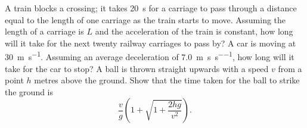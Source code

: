 \documentclass[a4paper]{exam}
\begin{document}
\begin{questions}
    \question A train blocks a crossing; it takes \SI{20}{\second} for a carriage to pass through a distance
              equal to the length of one carriage as the train starts to move. Assuming the length of a carriage is $ L $
              and the acceleration of the train is constant, how long will it take for the next twenty railway carriages
              to pass by?
    \question A car is moving at \SI{30}{\metre\per\second}. Assuming an average deceleration of \SI{7.0}{\metre\per\second\per\second},
              how long will it take for the car to stop?
    \question A ball is thrown straight upwards with a speed $ v $ from a point $ h $ metres above the ground. Show that the time
              taken for the ball to strike the ground is
              \[ \frac{v}{g}\left( 1 + \sqrt{1 + \frac{2hg}{v^2}} \right). \]
  \end{questions}
\end{document}

